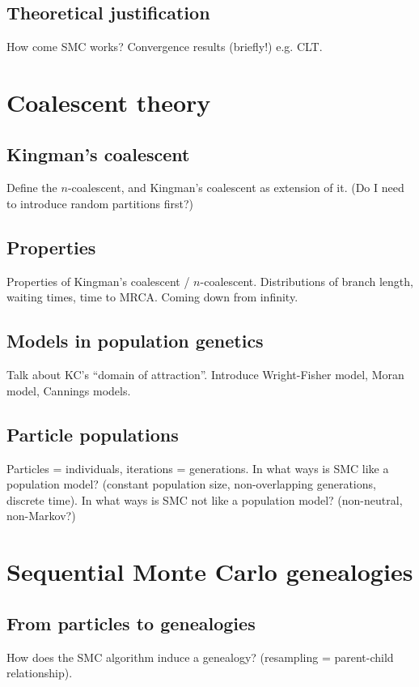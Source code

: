 \subsection{Theoretical justification}
How come SMC works? Convergence results (briefly!) e.g. CLT.


\section{Coalescent theory}

\subsection{Kingman's coalescent}
Define the $n$-coalescent, and Kingman's coalescent as extension of it. (Do I need to introduce random partitions first?)

\subsection{Properties}
Properties of Kingman's coalescent / $n$-coalescent. Distributions of branch length, waiting times, time to MRCA. Coming down from infinity.

\subsection{Models in population genetics}
Talk about KC's ``domain of attraction''. Introduce Wright-Fisher model, Moran model, Cannings models.

\subsection{Particle populations}
Particles = individuals, iterations = generations. In what ways is SMC like a population model? (constant population size, non-overlapping generations, discrete time). In what ways is SMC not like a population model? (non-neutral, non-Markov?)


\section{Sequential Monte Carlo genealogies}

\subsection{From particles to genealogies}
How does the SMC algorithm induce a genealogy? (resampling = parent-child relationship). 


